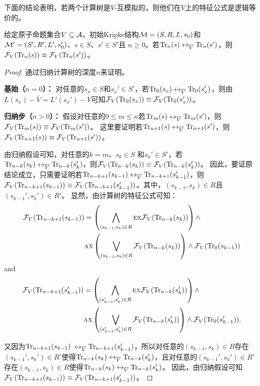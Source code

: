 下面的结论表明，若两个计算树是$V$-互模拟的，则他们在$V$上的特征公式是逻辑等价的。
\begin{lemma}\label{lem:Vb:TrFormula:Equ}
	给定原子命题集合$V\subseteq {\cal A}$、初始Kripke结构${\cal M}=(S,R,L,s_0)$和${\cal M}'=(S',R',L',s_0')$、$s\in S$、$s'\in S'$且 $n\ge 0$。若$\textrm{Tr}_n(s) \leftrightarrow_{\overline V} \textrm{Tr}_n(s')$，则${\cal F}_V(\textrm{Tr}_n(s)) \equiv {\cal F}_V(\textrm{Tr}_n(s'))$。
\end{lemma}
\begin{proof}
	通过归纳计算树的深度$n$来证明。
	
	\textbf{基始（$n=0$）：} 对任意的$s_x\in S$和$s_x' \in S'$，若$\textrm{Tr}_0(s_x) \leftrightarrow_{\overline V} \textrm{Tr}_0(s_x')$，则由$L(s_x) - \overline V = L'(s_x') - \overline V$可知${\cal F}_V(\textrm{Tr}_0(s_x)) \equiv {\cal F}_V(\textrm{Tr}_0(s_x'))$。
	
	\textbf{归纳步（$n>0$）：} 假设对任意的$0\leq m \leq n$若$\textrm{Tr}_m(s) \leftrightarrow_{\overline V} \textrm{Tr}_m(s')$，则${\cal F}_V(\textrm{Tr}_m(s)) \equiv {\cal F}_V(\textrm{Tr}_m(s'))$。
	这里要证明若$\textrm{Tr}_{n+1}(s) \leftrightarrow_{\overline V} \textrm{Tr}_{n+1}(s')$，则${\cal F}_V(\textrm{Tr}_{n+1}(s)) \equiv {\cal F}_V(\textrm{Tr}_{n+1}(s'))$。
	
	由归纳假设可知，对任意的$k=m$、$s_k\in S$ 和$s_k'\in S'$，若$\textrm{Tr}_{n-k}(s_k) \leftrightarrow_{\overline V} \textrm{Tr}_{n-k}(s_k')$，则${\cal F}_V(\textrm{Tr}_{n-k}(s_k)) \equiv {\cal F}_V(\textrm{Tr}_{n-k}(s_k'))$。
	因此，要证原结论成立，只需要证明若$\textrm{Tr}_{n-k+1}(s_{k-1}) \leftrightarrow_{\overline V} \textrm{Tr}_{n-k+1}(s_{k-1}')$，则${\cal F}_V(\textrm{Tr}_{n-k+1}(s_{k-1})) \equiv {\cal F}_V(\textrm{Tr}_{n-k+1}(s_{k-1}'))$。其中，$(s_{k-1},s_k)\in R$且$(s_{k-1}',s_k')\in R'$。
	显然，由计算树的特征公式可知：
	\begin{align*}
		{\cal F}_V(\textrm{Tr}_{n-k+1}(s_{k-1})) &  =
		\left(\bigwedge_{(s_{k-1},s_k)\in R}
		\textsc{e} \textsc{x} {\cal F}_V(\textrm{Tr}_{n-k}(s_k))\right)
		\wedge \\
		&\textsc{a} \textsc{x}\left(\bigvee_{(s_{k-1},s_k)\in R}
		{\cal F}_V(\textrm{Tr}_{n-k}(s_k) )\right)
		\wedge {\cal F}_V(\textrm{Tr}_0(s_{k-1}))
	\end{align*}
	and
	\begin{align*}
		{\cal F}_V(\textrm{Tr}_{n-k+1}(s_{k-1}')) &  =
		\left(\bigwedge_{(s_{k-1}',s_k')\in R}
		\textsc{e} \textsc{x} {\cal F}_V(\textrm{Tr}_{n-k}(s_k'))\right)
		\wedge \\
		&\textsc{a} \textsc{x}\left(\bigvee_{(s_{k-1}',s_k')\in R}
		{\cal F}_V(\textrm{Tr}_{n-k}(s_k') )\right)
		\wedge {\cal F}_V(\textrm{Tr}_0(s_{k-1}')).
	\end{align*} 

	又因为$\textrm{Tr}_{n-k+1}(s_{k-1})$ $\leftrightarrow_{\overline V} \textrm{Tr}_{n-k+1}(s_{k-1}')$，所以对任意的$(s_{k-1}, s_k) \in R$存在$(s_{k-1}', s_k') \in R'$使得$\textrm{Tr}_{n-k}(s_k) \leftrightarrow_{\overline V} \textrm{Tr}_{n-k}(s_k')$，且对任意的$(s_{k-1}', s_k') \in R'$存在$(s_{k-1}, s_k) \in R$使得$\textrm{Tr}_{n-k}(s_k) \leftrightarrow_{\overline V} \textrm{Tr}_{n-k}(s_k')$。
	因此，由归纳假设可知${\cal F}_V(\textrm{Tr}_{n-k+1}(s_{k-1})) \equiv {\cal F}_V(\textrm{Tr}_{n-k+1}(s_{k-1}'))$。
\end{proof}

